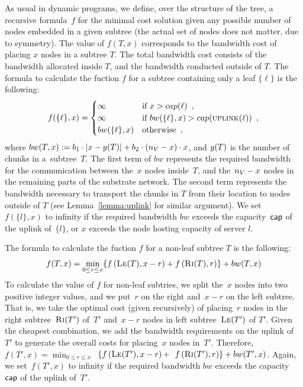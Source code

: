 As usual in dynamic programs, we define, over the structure of the tree, a
recursive formula~$f$ for
the minimal cost solution given any possible number of nodes
embedded in a given subtree (the actual set of nodes does not matter,
due to symmetry).
The value of $f(T, x)$ corresponds to the bandwidth cost of placing $x$ nodes in a subtree $T$.
The total bandwidth cost consists of the bandwidth allocated inside $T$, and the bandwidth conducted outside of $T$.
The formula to calculate the fuction $f$ for a subtree containing only a leaf $\{ \ell \}$ is the following:
\[
f(\{ \ell \}, x) =
\begin{cases}
   \infty & \mbox{if } x > cap(\ell)\enspace,\\
   \infty & \mbox{if } bw(\{ \ell \}, x) > cap(\textsc{uplink}(\ell))\enspace,\\
    bw(\{ \ell \}, x) & \mbox{otherwise}\enspace, \\
  \end{cases}
  \]
where $bw(T,x) := b_1 \cdot |x - y(T)| +b_2 \cdot
(n_V - x) \cdot x$, and $y(T)$ is the number of chunks in a~subtree~$T$.
The first term of $bw$ represents the required bandwidth for the communication between the~$x$
nodes inside~$T$, and the~$n_V - x$ nodes in the remaining parts of the substrate
network.
The second term represents
the bandwidth necessary to transport the chunks in $T$ from their location to
nodes outside of $T$ (see Lemma~\ref{lemma:uplink} for similar argument).
We set~$f(\{ l \},x)$ to infinity if the required bandwidth
$bw$ exceeds the capacity~$\textsf{cap}$ of the uplink of~$\{ l \}$, or $x$ exceeds the node hosting capacity of server $l$.


The formula to calculate the fuction $f$ for a non-leaf subtree $T$ is the following:
\[
  f(T, x) = 
    \min_{0\leq r \leq x} \{  f\left(\textsc{Le}(T),
x-r\right) +
f\left(\textsc{Ri}(T), r\right) \} + bw(T,x)
  \]
To calculate the value of $f$ for non-leaf subtries, we split the~$x$ nodes
into two positive integer
values, and we put~$r$ on the right and~$x - r$ on the left subtree.
That is, we take the optimal cost
(given recursively) of placing~$r$ nodes in
the right subtree~$\textsc{Ri}(T')$ of~$T'$ and~$x-r$ nodes in left subtree~$\textsc{Le}(T')$ of
$T'$. Given the cheapest combination, we add the bandwidth requirements
on the uplink of~$T'$ to generate the overall costs for placing~$x$ nodes in~$T'$.
Therefore,~$f(T',x) =   \min_{0\leq r \leq x}$~$ \{  f\left(\textsc{Le}(T'),
x-r\right) +$~$
f\left(\textsc{Ri}(T'), r\right) \} + bw(T',x)$.
Again, we set~$f(T',x)$ to infinity if the required bandwidth
$bw$ exceeds the capacity~$\textsf{cap}$ of the uplink of~$T'$.

